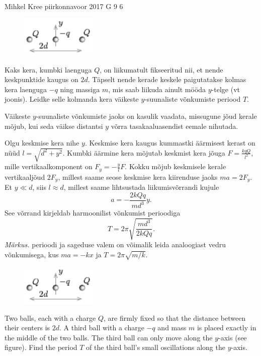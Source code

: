 {Mihkel Kree} %
{piirkonnavoor} %
{2017} %
{G 9} %
{6} %
{
\ifStatement
\begin{figure}
	\vspace{-25pt}
	\begin{center}
		\includegraphics[width=0.32\textwidth]{2017-v2g-09-laengudjoonis.pdf}
	\end{center}
	\vspace{-10pt}
\end{figure}

Kaks kera, kumbki laenguga $Q$, on liikumatult fikseeritud nii, et nende keskpunktide kaugus on $2d$. Täpselt nende kerade keskele paigutatakse kolmas kera laenguga $-q$ ning massiga $m$, mis saab liikuda ainult mööda $y$-telge (vt joonis). Leidke selle kolmanda kera väikeste $y$-suunaliste võnkumiste periood $T$.
\fi


\ifHint
Väikeste $y$-suunaliste võnkumiste jaoks on kasulik vaadata, missugune jõud kerale mõjub, kui seda väikse distantsi $y$ võrra tasakaaluasendist eemale nihutada.
\fi


\ifSolution
Olgu keskmise kera nihe $y$. Keskmise kera kaugus kummastki äärmisest kerast on nüüd $l=\sqrt{d^2+y^2}$. Kumbki äärmine kera mõjutab keskmist kera jõuga $F=\frac{kqQ}{l^2}$, mille vertikaalkomponent on $F_y=-\frac{y}{l}F$. Kokku mõjub keskmisele kerale vertikaaljõud $2F_y$, millest saame seose keskmise kera kiirenduse jaoks $ma=2F_y$. Et $y\ll d$, siis $l\approx d$, millest saame lihtsustada liikumisvõrrandi kujule
\[
a=-\frac{2kQq}{md^3}y.
\]
See võrrand kirjeldab harmoonilist võnkumist perioodiga 
\[ T = 2\pi \sqrt{\frac{md^3}{2kQq}}.\]
{\em Märkus.} perioodi ja sageduse valem on võimalik leida analoogiast vedru võnkumisega, kus $ma = -kx$ ja $T=2\pi \sqrt{m/k}$.
\fi


\ifEngStatement
\begin{figure}
	\vspace{-25pt}
	\begin{center}
		\includegraphics[width=0.32\textwidth]{2017-v2g-09-laengudjoonis}
	\end{center}
	\vspace{-10pt}
\end{figure}
Two balls, each with a charge $Q$, are firmly fixed so that the distance between their centers is $2d$. A third ball with a charge $-q$ and mass $m$ is placed exactly in the middle of the two balls. The third ball can only move along the $y$-axis (see figure). Find the period $T$ of the third ball’s small oscillations along the $y$-axis.
\fi


}
